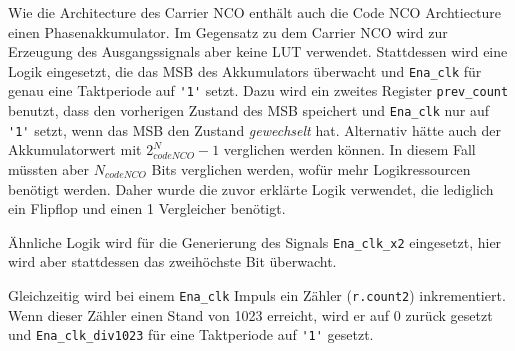 Wie die Architecture des Carrier NCO enthält auch die Code NCO Archtiecture einen Phasenakkumulator. Im Gegensatz zu dem Carrier NCO wird zur Erzeugung des Ausgangssignals aber keine \gls{LUT} verwendet. Stattdessen wird eine Logik eingesetzt, die das MSB des Akkumulators überwacht und \lstinline$Ena_clk$ für genau eine Taktperiode auf \lstinline$'1'$ setzt. Dazu wird ein zweites Register \lstinline$prev_count$ benutzt, dass den vorherigen Zustand des MSB speichert und \lstinline$Ena_clk$ nur auf \lstinline$'1'$ setzt, wenn das MSB den Zustand \emph{gewechselt} hat. Alternativ hätte auch der Akkumulatorwert mit $2^N_{codeNCO}-1$ verglichen werden können. In diesem Fall müssten aber $N_{codeNCO}$ Bits verglichen werden, wofür mehr Logikressourcen benötigt werden. Daher wurde die zuvor erklärte Logik verwendet, die lediglich ein Flipflop und einen \SI{1}{\bit} Vergleicher benötigt.

Ähnliche Logik wird für die Generierung des Signals \lstinline$Ena_clk_x2$ eingesetzt, hier wird aber stattdessen das zweihöchste Bit überwacht.

Gleichzeitig wird bei einem \lstinline$Ena_clk$ Impuls ein Zähler (\lstinline$r.count2$) inkrementiert. Wenn dieser Zähler einen Stand von 1023 erreicht, wird er auf $0$ zurück gesetzt und \lstinline$Ena_clk_div1023$ für eine Taktperiode auf \lstinline$'1'$ gesetzt.


